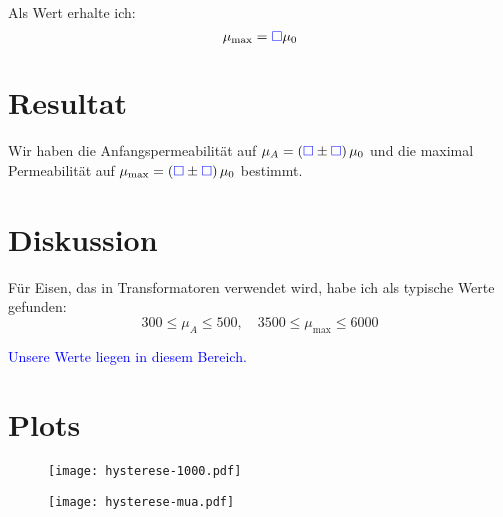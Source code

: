 \documentclass[11pt, ngerman]{article}
\newcommand{\emesswert}{\left(\messwert \pm \messwert \right)}
\newcommand{\messwert}{\textcolor{blue}{\square}}
\begin{document}
Als Wert erhalte ich:
\[ \mu_\text{max} = \messwert \mu_0 \]

\section{Resultat}

Wir haben die Anfangspermeabilität auf $\mu_A = \emesswert \mu_0$ und die maximal Permeabilität auf $\mu_\text{max} = \emesswert \mu_0$ bestimmt.

\section{Diskussion}

Für Eisen, das in Transformatoren verwendet wird, habe ich als typische Werte gefunden: \cite{wikipedia.armco}
\[
	300 \leq \mu_A \leq 500
	, \quad
	3500 \leq \mu_\text{max} \leq 6000
\]

\textcolor{blue}{Unsere Werte liegen in diesem Bereich.}





\newpage

\section{Plots}


\begin{figure}[h!]
	\centering
	\texttt{[image: hysterese-1000.pdf]}
\end{figure}

\begin{figure}[h!]
	\centering
	\texttt{[image: hysterese-mua.pdf]}
\end{figure}
\end{document}
